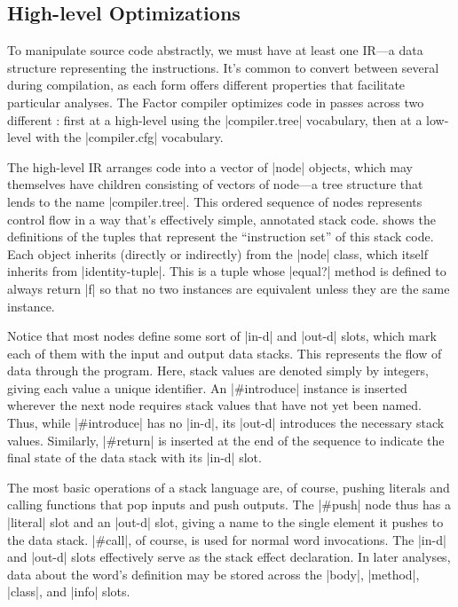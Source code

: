 \subsection{High-level Optimizations}\label{sec:compiler:tree}

To manipulate source code abstractly, we must have at least one \gls{IR}---a
data structure representing the instructions.  It's common to convert between
several  during compilation, as each form offers different
properties that facilitate particular analyses.  The Factor compiler optimizes
code in passes across two different : first at a high-level using
the \factor|compiler.tree| vocabulary, then at a low-level with the
\factor|compiler.cfg| vocabulary.


The high-level \gls{IR} arranges code into a vector of \factor|node| objects,
which may themselves have children consisting of vectors of node---a tree
structure that lends to the name \factor|compiler.tree|.  This ordered sequence
of nodes represents control flow in a way that's effectively simple, annotated
stack code.   shows the definitions of the tuples that represent
the ``instruction set'' of this stack code.  Each object inherits (directly or
indirectly) from the \factor|node| class, which itself inherits from
\factor|identity-tuple|.  This is a tuple whose \factor|equal?| method is
defined to always return \factor|f| so that no two instances are equivalent
unless they are the same instance.

Notice that most nodes define some sort of \factor|in-d| and \factor|out-d|
slots, which mark each of them with the input and output data stacks.  This
represents the flow of data through the program.  Here, stack values are
denoted simply by integers, giving each value a unique identifier.  An
\factor|#introduce| instance is inserted wherever the next node requires stack
values that have not yet been named.  Thus, while \factor|#introduce| has no
\factor|in-d|, its \factor|out-d| introduces the necessary stack values.
Similarly, \factor|#return| is inserted at the end of the sequence to indicate
the final state of the data stack with its \factor|in-d| slot.

The most basic operations of a stack language are, of course, pushing literals
and calling functions that pop inputs and push outputs.  The \factor|#push|
node thus has a \factor|literal| slot and an \factor|out-d| slot, giving a name
to the single element it pushes to the data stack.  \factor|#call|, of course,
is used for normal word invocations.  The \factor|in-d| and \factor|out-d|
slots effectively serve as the stack effect declaration.  In later analyses,
data about the word's definition may be stored across the \factor|body|,
\factor|method|, \factor|class|, and \factor|info| slots.

